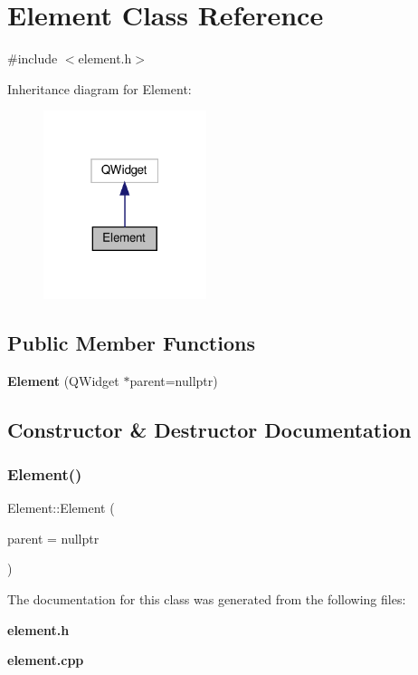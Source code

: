 \section{Element Class Reference}
\label{classElement}


{\ttfamily \#include $<$element.\+h$>$}



Inheritance diagram for Element\+:\nopagebreak
\begin{figure}[H]
\begin{center}
\leavevmode
\includegraphics[width=135pt]{classElement__inherit__graph}
\end{center}
\end{figure}
\subsection*{Public Member Functions}
\begin{DoxyCompactItemize}
\item 
\textbf{ Element} (Q\+Widget $\ast$parent=nullptr)
\end{DoxyCompactItemize}


\subsection{Constructor \& Destructor Documentation}
\mbox{\label{classElement_a13abe7d029dbf66dac43fca1ae8f23ee}} 
\subsubsection{Element()}
{\footnotesize\ttfamily Element\+::\+Element (\begin{DoxyParamCaption}\item[{Q\+Widget $\ast$}]{parent = {\ttfamily nullptr} }\end{DoxyParamCaption})\hspace{0.3cm}{\ttfamily [explicit]}}



The documentation for this class was generated from the following files\+:\begin{DoxyCompactItemize}
\item 
\textbf{ element.\+h}\item 
\textbf{ element.\+cpp}\end{DoxyCompactItemize}
